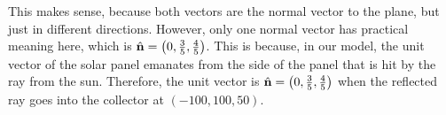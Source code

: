 \documentclass[12pt,a4paper]{article}
\begin{document}
\begin{solution}
This makes sense, because both vectors are the normal vector to the plane, but just in different directions. However, only one normal vector has practical meaning here, which is $\hat{\mathbf{n}}=\left(0, \frac{3}{5}, \frac{4}{5}\right)$.
This is because, in our model, the unit vector of the solar panel emanates from the side of the panel that is hit by the ray from the sun. Therefore, the unit vector is $\hat{\mathbf{n}}=\left(0, \frac{3}{5}, \frac{4}{5}\right)$ when the reflected ray goes into the collector at $(-100, 100, 50)$.


\end{solution}
\end{document}
